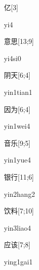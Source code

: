 \begin{verbete}[yi4]{亿}[3]
\begin{pronuncia}{yi4}
\end{pronuncia}
\end{verbete}

\begin{verbete}[yi4si0]{意思}[13;9]
\begin{pronuncia}{yi4si0}
\end{pronuncia}
\end{verbete}

\begin{verbete}{阴天}[6;4]
\begin{pronuncia}{yin1tian1}
\end{pronuncia}
\end{verbete}

\begin{verbete}{因为}[6;4]
\begin{pronuncia}{yin1wei4}
\end{pronuncia}
\end{verbete}

\begin{verbete}{音乐}[9;5]
\begin{pronuncia}{yin1yue4}
\end{pronuncia}
\end{verbete}

\begin{verbete}{银行}[11;6]
\begin{pronuncia}{yin2hang2}
\end{pronuncia}
\end{verbete}

\begin{verbete}{饮料}[7;10]
\begin{pronuncia}{yin3liao4}
\end{pronuncia}
\end{verbete}

\begin{verbete}{应该}[7;8]
\begin{pronuncia}{ying1gai1}
\end{pronuncia}
\end{verbete}

